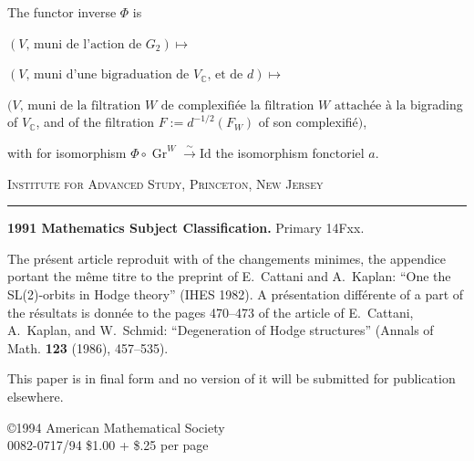 \documentclass[12pt,a4paper]{article}
\theoremstyle{plain}
\theoremstyle{definition}
\DeclareMathOperator{\Gr}{Gr}
\newcommand{\C}{\mathbb{C}}
\begin{document}
The functor inverse $\Phi$ is

$(V \text{, muni de l'action de } G_2) \mapsto$

$(V \text{, muni d'une bigraduation de } V_\C \text{, et de } d) \mapsto$

$(V \text{, muni de la filtration } W \text{ de complexifi\'{e}e la filtration } W \text{ attach\'{e}e \`{a} la}$
bigrading of $V_\C$, and of the filtration $F := d^{-1/2}(F_W)$ of son complexifi\'{e}$)$,

with for isomorphism $\Phi \circ \Gr^W \xrightarrow{\sim} \mathrm{Id}$ the isomorphism fonctoriel $a$.

\vspace{1cm}

\begin{flushright}
\textsc{Institute for Advanced Study, Princeton, New Jersey}
\end{flushright}

\vfill

\begin{center}
\rule{0.5\textwidth}{0.4pt}
\end{center}

\vspace{0.3cm}

{\small\noindent\textbf{1991 Mathematics Subject Classification.} Primary 14Fxx.}

\vspace{0.2cm}

{\small\noindent The pr\'{e}sent article reproduit with of the changements minimes, the appendice portant the m\^{e}me titre
to the preprint of E.~Cattani and A.~Kaplan: ``One the SL(2)-orbits in Hodge theory'' (IHES 1982).
A pr\'{e}sentation diff\'{e}rente of a part of the r\'{e}sultats is donn\'{e}e to the pages 470--473 of the article
of E.~Cattani, A.~Kaplan, and W.~Schmid: ``Degeneration of Hodge structures'' (Annals of Math.
\textbf{123} (1986), 457--535).}

\vspace{0.2cm}

{\small\noindent This paper is in final form and no version of it will be submitted for publication elsewhere.}

\vspace{0.2cm}

{\small\noindent \copyright 1994 American Mathematical Society\\
0082-0717/94 \$1.00 + \$.25 per page}
\end{document}
